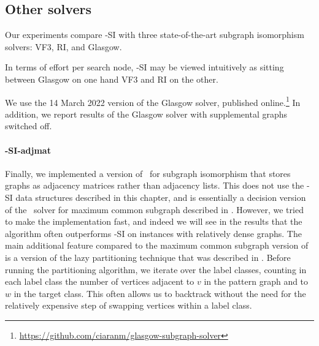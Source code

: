 \subsection{Other solvers}

Our experiments compare \McSplit-SI with three state-of-the-art subgraph isomorphism solvers:
VF3, RI, and Glasgow.  

In terms of effort per search node, \McSplit-SI may be viewed intuitively as sitting
between Glasgow on one hand VF3 and RI on the other.

We use the 14 March 2022 version of the Glasgow solver, published
online.\footnote{\url{https://github.com/ciaranm/glasgow-subgraph-solver}}
In addition, we report results of the Glasgow solver with supplemental graphs
switched off.

\paragraph*{\McSplit-SI-adjmat} Finally, we implemented a version of \McSplit\
for subgraph isomorphism that stores graphs as adjacency matrices rather than
adjacency lists.  This does not use the \McSplit-SI data structures described
in this chapter, and is essentially a decision version of the \McSplit\ solver
for maximum common subgraph described in \label{c:mcsplit-i-undirected}.
However, we tried to make the implementation fast, and indeed we will see in
the results that the algorithm often outperforms \McSplit-SI on instances with
relatively dense graphs.  The main additional feature compared to the maximum
common subgraph version of \McSplit is a version of the lazy partitioning
technique that was described in \Cref{subsec:mcsplit-si-optimisations}.  Before
running the partitioning algorithm, we iterate over the label classes, counting
in each label class the number of vertices adjacent to $v$ in the pattern graph
and to $w$ in the target class.  This often allows us to backtrack without the
need for the relatively expensive step of swapping vertices within a label
class.

